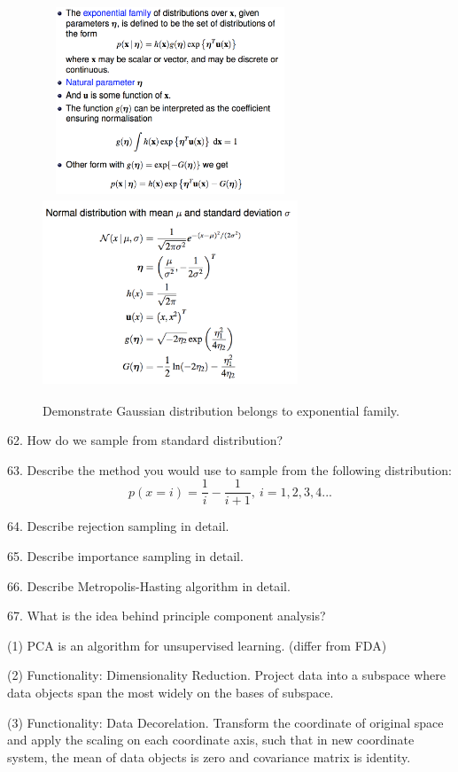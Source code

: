\documentclass[11pt,a4paper]{article}
\begin{document}
\begin{figure}[H] \centering
    \includegraphics[width=3in,height=2.2in]{./figure/expfamily_1.png}
    \includegraphics[width=3in,height=2.2in]{./figure/expfamily_2.png}
    \caption{Demonstrate Gaussian distribution belongs to exponential family.}
\end{figure}

62. How do we sample from standard distribution?

63. Describe the method you would use to sample from the following distribution:
$$ p(x=i) = \frac{1}{i} - \frac{1}{i+1},\ i = 1,2,3,4 ...$$

64. Describe rejection sampling in detail.

65. Describe importance sampling in detail.

66. Describe Metropolis-Hasting algorithm in detail.

67. What is the idea behind principle component analysis?

(1) PCA is an algorithm for unsupervised learning. (differ from FDA)

(2) Functionality: Dimensionality Reduction. Project data into a subspace where data objects span the most widely on the bases of subspace.

(3) Functionality: Data Decorelation. Transform the coordinate of original space and apply the scaling on each coordinate axis, such that in new coordinate system, the mean of data objects is zero and covariance matrix is identity.
\end{document}
